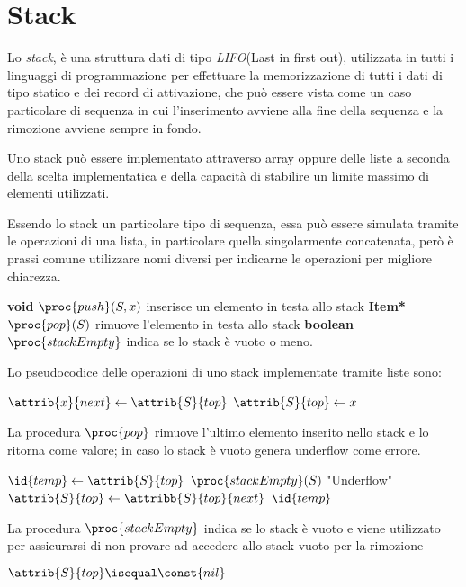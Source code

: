\section{Stack}
Lo \emph{stack}, è una struttura dati di tipo \emph{LIFO}(Last in first out), utilizzata
in tutti i linguaggi di programmazione per effettuare la memorizzazione di tutti i dati
di tipo statico e dei record di attivazione, che può essere vista come un caso particolare
di sequenza in cui l'inserimento avviene alla fine della sequenza e la rimozione avviene sempre in fondo.

Uno stack può essere implementato attraverso array oppure delle liste a seconda della
scelta implementatica e della capacità di stabilire un limite massimo di elementi utilizzati.

Essendo lo stack un particolare tipo di sequenza, essa può essere simulata tramite le operazioni di una lista,
in particolare quella singolarmente concatenata, però è prassi comune utilizzare
nomi diversi per indicarne le operazioni per migliore chiarezza.

\textbf{void} $\proc{push}(S,x)$ inserisce un elemento in testa allo stack \newline
\textbf{Item*} $\proc{pop}(S)$ rimuove l'elemento in testa allo stack \newline
\textbf{boolean} $\proc{stackEmpty}$ indica se lo stack è vuoto o meno.

Lo pseudocodice delle operazioni di uno stack implementate tramite liste sono:
\begin{codebox}
\li $\attrib{x}{next} \gets \attrib{S}{top}$
\li $\attrib{S}{top} \gets x$
\end{codebox}

La procedura $\proc{pop}$ rimuove l'ultimo elemento inserito nello stack e lo ritorna
come valore; in caso lo stack è vuoto genera underflow come errore.
\begin{codebox}
\li $\id{temp} \gets \attrib{S}{top}$
\li \If $\proc{stackEmpty}(S)$
    \Then
\li        \Error "Underflow"
    \End
\li $\attrib{S}{top} \gets \attribb{S}{top}{next}$
\li \Return $\id{temp}$
\end{codebox}

La procedura $\proc{stackEmpty}$ indica se lo stack è vuoto e viene utilizzato per
assicurarsi di non provare ad accedere allo stack vuoto per la rimozione
\begin{codebox}
\li \Return $ \attrib{S}{top} \isequal \const{nil}$
\end{codebox}

